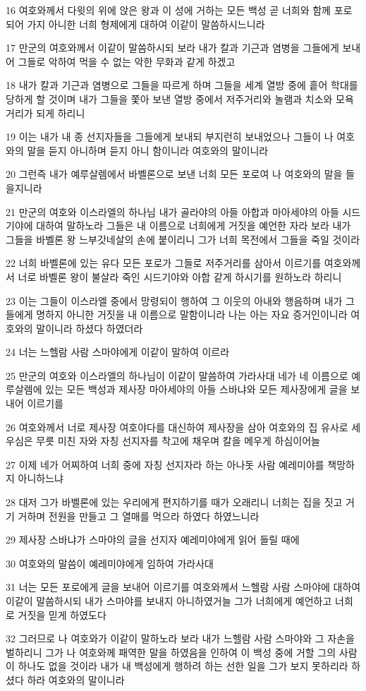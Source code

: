 \par 16 여호와께서 다윗의 위에 앉은 왕과 이 성에 거하는 모든 백성 곧 너희와 함께 포로되어 가지 아니한 너희 형제에게 대하여 이같이 말씀하시느니라
\par 17 만군의 여호와께서 이같이 말씀하시되 보라 내가 칼과 기근과 염병을 그들에게 보내어 그들로 악하여 먹을 수 없는 악한 무화과 같게 하겠고
\par 18 내가 칼과 기근과 염병으로 그들을 따르게 하며 그들을 세계 열방 중에 흩어 학대를 당하게 할 것이며 내가 그들을 쫓아 보낸 열방 중에서 저주거리와 놀램과 치소와 모욕거리가 되게 하리니
\par 19 이는 내가 내 종 선지자들을 그들에게 보내되 부지런히 보내었으나 그들이 나 여호와의 말을 듣지 아니하며 듣지 아니 함이니라 여호와의 말이니라
\par 20 그런즉 내가 예루살렘에서 바벨론으로 보낸 너희 모든 포로여 나 여호와의 말을 들을지니라
\par 21 만군의 여호와 이스라엘의 하나님 내가 골라야의 아들 아합과 마아세야의 아들 시드기야에 대하여 말하노라 그들은 내 이름으로 너희에게 거짓을 예언한 자라 보라 내가 그들을 바벨론 왕 느부갓네살의 손에 붙이리니 그가 너희 목전에서 그들을 죽일 것이라
\par 22 너희 바벨론에 있는 유다 모든 포로가 그들로 저주거리를 삼아서 이르기를 여호와께서 너로 바벨론 왕이 불살라 죽인 시드기야와 아합 같게 하시기를 원하노라 하리니
\par 23 이는 그들이 이스라엘 중에서 망령되이 행하여 그 이웃의 아내와 행음하며 내가 그들에게 명하지 아니한 거짓을 내 이름으로 말함이니라 나는 아는 자요 증거인이니라 여호와의 말이니라 하셨다 하였더라
\par 24 너는 느헬람 사람 스마야에게 이같이 말하여 이르라
\par 25 만군의 여호와 이스라엘의 하나님이 이같이 말씀하여 가라사대 네가 네 이름으로 예루살렘에 있는 모든 백성과 제사장 마아세야의 아들 스바냐와 모든 제사장에게 글을 보내어 이르기를
\par 26 여호와께서 너로 제사장 여호야다를 대신하여 제사장을 삼아 여호와의 집 유사로 세우심은 무릇 미친 자와 자칭 선지자를 착고에 채우며 칼을 메우게 하심이어늘
\par 27 이제 네가 어찌하여 너희 중에 자칭 선지자라 하는 아나돗 사람 예레미야를 책망하지 아니하느냐
\par 28 대저 그가 바벨론에 있는 우리에게 편지하기를 때가 오래리니 너희는 집을 짓고 거기 거하며 전원을 만들고 그 열매를 먹으라 하였다 하였느니라
\par 29 제사장 스바냐가 스마야의 글을 선지자 예레미야에게 읽어 들릴 때에
\par 30 여호와의 말씀이 예레미야에게 임하여 가라사대
\par 31 너는 모든 포로에게 글을 보내어 이르기를 여호와께서 느헬람 사람 스마야에 대하여 이같이 말씀하시되 내가 스마야를 보내지 아니하였거늘 그가 너희에게 예언하고 너희로 거짓을 믿게 하였도다
\par 32 그러므로 나 여호와가 이같이 말하노라 보라 내가 느헬람 사람 스마야와 그 자손을 벌하리니 그가 나 여호와께 패역한 말을 하였음을 인하여 이 백성 중에 거할 그의 사람이 하나도 없을 것이라 내가 내 백성에게 행하려 하는 선한 일을 그가 보지 못하리라 하셨다 하라 여호와의 말이니라


